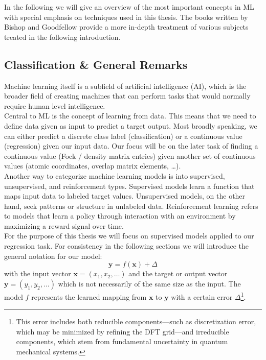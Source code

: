 In the following we will give an overview of the most important concepts in ML with special emphasis on techniques used in this thesis. The books written by Bishop \parencite{ref:bishop2006pattern} and Goodfellow \parencite{ref:goodfellow2016deep} provide a more in-depth treatment of various subjects treated in the following introduction.
\subsection{Classification \& General Remarks}
\label{subsec:background_ml_general_concepts}
Machine learning itself is a subfield of artificial intelligence (AI), which is the broader field of creating machines that can perform tasks that would normally require human level intelligence. \\
Central to ML is the concept of learning from data. This means that we need to define data given as input to predict a target output. Most broadly speaking, we can either predict a discrete class label (classification) or a continuous value (regression) given our input data. Our focus will be on the later task of finding a continuous value (Fock / density matrix entries) given another set of continuous values (atomic coordinates, overlap matrix elements, \dots). \\
Another way to categorize machine learning models is into supervised, unsupervised, and reinforcement types. Supervised models learn a function that maps input data to labeled target values. Unsupervised models, on the other hand, seek patterns or structure in unlabeled data. Reinforcement learning refers to models that learn a policy through interaction with an environment by maximizing a reward signal over time.\\

For the purpose of this thesis we will focus on supervised models applied to our regression task. For consistency in the following sections we will introduce the general notation for our model: 
\begin{equation}
    \label{eq:general_ML_model_formula}
    \mathbf{y} = f(\mathbf{x}) + \Delta
\end{equation}
with the input vector $\mathbf{x} = (x_1, x_2, \dots)$ and the target or output vector $\mathbf{y} = (y_1, y_2, \dots)$ which is not necessarily of the same size as the input. The model $f$ represents the learned mapping from $\mathbf{x}$ to $\mathbf{y}$ with a certain 
error $\Delta$\footnote{This error includes both reducible components—such as discretization error, which may be minimized by refining the DFT grid—and irreducible components, which stem from fundamental uncertainty in quantum mechanical systems.}. 


